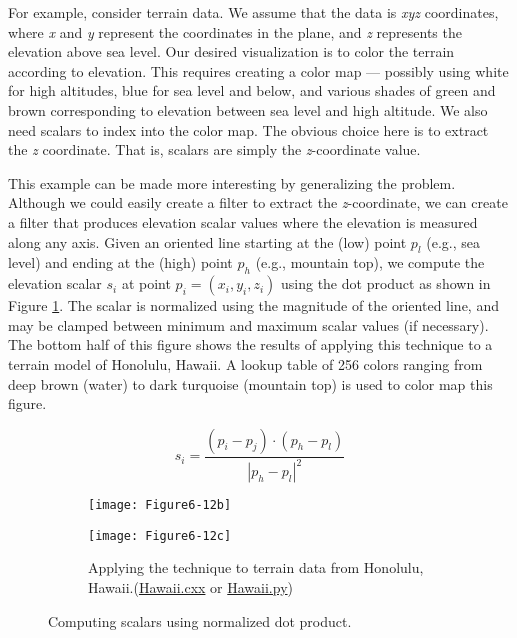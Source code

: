 For example, consider terrain data. We assume that the data is \emph{xyz} coordinates, where \emph{x} and \emph{y} represent the coordinates in the plane, and \emph{z} represents the elevation above sea level. Our desired visualization is to color the terrain according to elevation. This requires creating a color map --- possibly using white for high altitudes, blue for sea level and below, and various shades of green and brown corresponding to elevation between sea level and high altitude. We also need scalars to index into the color map. The obvious choice here is to extract the \emph{z} coordinate. That is, scalars are simply the \emph{z}-coordinate value.

This example can be made more interesting by generalizing the problem. Although we could easily create a filter to extract the \emph{z}-coordinate, we can create a filter that produces elevation scalar values where the elevation is measured along any axis. Given an oriented line starting at the (low) point $p_l$ (e.g., sea level) and ending at the (high) point $p_h$ (e.g., mountain top), we compute the elevation scalar $s_i$ at point $p_i = (x_i, y_i,z_i)$ using the dot product as shown in Figure \ref{fig:Figure6-12}. The scalar is normalized using the magnitude of the oriented line, and may be clamped between minimum and maximum scalar values (if necessary). The bottom half of this figure shows the results of applying this technique to a terrain model of Honolulu, Hawaii. A lookup table of 256 colors ranging from deep brown (water) to dark turquoise (mountain top) is used to color map this figure.

\begin{figure}[htb]
	\begin{subfigure}[h]{0.48\linewidth}
		\begin{equation*}
			s_i = \frac{(p_i-p_j) \cdot (p_h-p_l)}{|p_h-p_l|^2}
		\end{equation*}
	\end{subfigure}
	\begin{subfigure}[h]{0.48\linewidth}
	\texttt{[image: Figure6-12b]}
	\end{subfigure}
	\hfill
	\begin{subfigure}[h]{0.48\linewidth}
		\texttt{[image: Figure6-12c]}
		\caption*{Applying the technique to terrain data from Honolulu, Hawaii.(\href{https://lorensen.github.io/VTKExamples/site/Cxx/Visualization/Hawaii}{Hawaii.cxx} or \href{https://lorensen.github.io/VTKExamples/site/Python/Visualization/Hawaii/}{Hawaii.py})}
	\end{subfigure}%
	\caption{Computing scalars using normalized dot product.}\label{fig:Figure6-12}
\end{figure}


